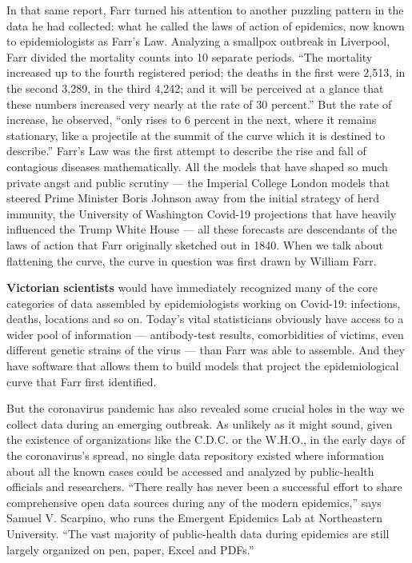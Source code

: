 In that same report, Farr turned his attention to another puzzling
pattern in the data he had collected: what he called the laws of action
of epidemics, now known to epidemiologists as Farr's Law. Analyzing a
smallpox outbreak in Liverpool, Farr divided the mortality counts into
10 separate periods. ``The mortality increased up to the fourth
registered period; the deaths in the first were 2,513, in the second
3,289, in the third 4,242; and it will be perceived at a glance that
these numbers increased very nearly at the rate of 30 percent.'' But the
rate of increase, he observed, ``only rises to 6 percent in the next,
where it remains stationary, like a projectile at the summit of the
curve which it is destined to describe.'' Farr's Law was the first
attempt to describe the rise and fall of contagious diseases
mathematically. All the models that have shaped so much private angst
and public scrutiny --- the Imperial College London models that steered
Prime Minister Boris Johnson away from the initial strategy of herd
immunity, the University of Washington Covid-19 projections that have
heavily influenced the Trump White House --- all these forecasts are
descendants of the laws of action that Farr originally sketched out in
1840. When we talk about flattening the curve, the curve in question was
first drawn by William Farr.

\textbf{Victorian scientists} would have immediately recognized many of
the core categories of data assembled by epidemiologists working on
Covid-19: infections, deaths, locations and so on. Today's vital
statisticians obviously have access to a wider pool of information ---
antibody-test results, comorbidities of victims, even different genetic
strains of the virus --- than Farr was able to assemble. And they have
software that allows them to build models that project the
epidemiological curve that Farr first identified.

But the coronavirus pandemic has also revealed some crucial holes in the
way we collect data during an emerging outbreak. As unlikely as it might
sound, given the existence of organizations like the C.D.C. or the
W.H.O., in the early days of the coronavirus's spread, no single data
repository existed where information about all the known cases could be
accessed and analyzed by public-health officials and researchers.
``There really has never been a successful effort to share comprehensive
open data sources during any of the modern epidemics,'' says Samuel V.
Scarpino, who runs the Emergent Epidemics Lab at Northeastern
University. ``The vast majority of public-health data during epidemics
are still largely organized on pen, paper, Excel and PDFs.''

